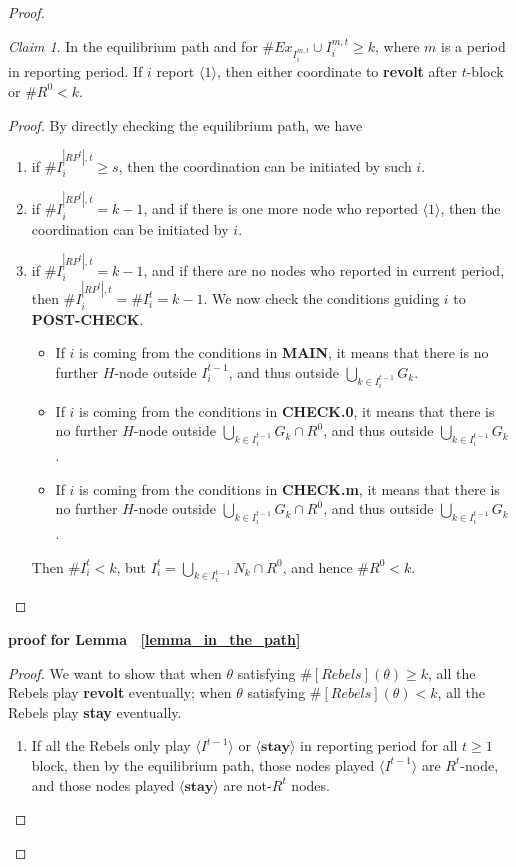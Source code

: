 \documentclass[12pt,letter]{article}
\theoremstyle{definition}
\theoremstyle{remark}
\theoremstyle{claim}
\newtheorem{claim}{Claim}
\begin{document}
\begin{proof}
\begin{claim}
\label{claim_either_success_or_fail}
In the equilibrium path and for $\#Ex_{I^{m,t}_i}\cup I^{m,t}_i\geq k$, where $m$ is a period in reporting period. If $i$ report $\langle 1 \rangle$, then either coordinate to \textbf{revolt} after $t$-block or $\# R^0<k$.
\end{claim}
\begin{proof}
By directly checking the equilibrium path, we have
\begin{enumerate}
\item if $\# I^{|RP^t|,t}_i\geq s$, then the coordination can be initiated by such $i$.
\item if $\# I^{|RP^t|,t}_i= k-1$, and if there is one more node who reported $\langle 1 \rangle$, then the coordination can be initiated by $i$.
\item if $\# I^{|RP^t|,t}_i= k-1$, and if there are no nodes who reported in current period, then $\# I^{|RP^t|,t}_i=\# I^{t}_i= k-1$. We now check the conditions guiding $i$ to \textbf{POST-CHECK}.
\begin{itemize}
\item If $i$ is coming from the conditions in \textbf{MAIN}, it means that there is no further $H$-node outside $I^{t-1}_i$, and thus outside $\bigcup_{k\in I^{t-1}_i}G_k$.
\item If $i$ is coming from the conditions in \textbf{CHECK.0}, it means that there is no further $H$-node outside $\bigcup_{k\in I^{t-1}_i}G_k\cap R^0$, and thus outside $\bigcup_{k\in I^{t-1}_i}G_k$. 
\item If $i$ is coming from the conditions in \textbf{CHECK.m}, it means that there is no further $H$-node outside $\bigcup_{k\in I^{t-1}_i}G_k\cap R^0$, and thus outside $\bigcup_{k\in I^{t-1}_i}G_k$. 
\end{itemize}
Then $\# I^{t}_i< k$, but $I^t_i=\bigcup_{k\in I^{t-1}_i}N_k\cap R^0$, and hence $\# R^0<k$.

\end{enumerate}


\end{proof}




\noindent \textbf{proof for Lemma ~\ref{lemma_in_the_path}}
\begin{proof}
We want to show that when $\theta$ satisfying $\#[Rebels](\theta)\geq k$, all the Rebels play \textbf{revolt} eventually; when $\theta$ satisfying $\#[Rebels](\theta)< k$, all the Rebels play \textbf{stay} eventually.
\begin{enumerate}
\item If all the Rebels only play $\langle I^{t-1} \rangle$ or $\langle \textbf{stay} \rangle$ in reporting period for all $t\geq 1$ block, then by the equilibrium path, those nodes played $\langle I^{t-1} \rangle$ are $R^t$-node, and those nodes played $\langle \textbf{stay} \rangle$ are not-$R^t$ nodes. 


\end{enumerate}
\end{proof}
\end{proof}
\end{document}
